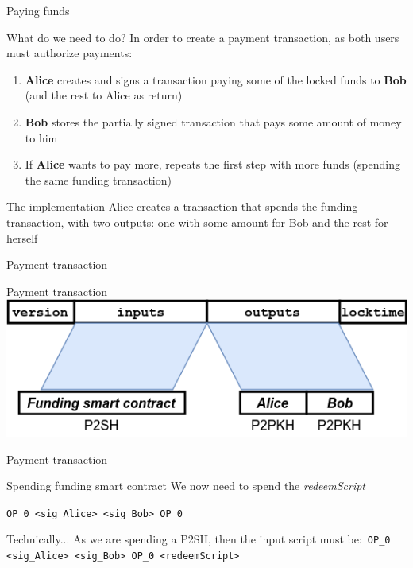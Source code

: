 \documentclass{beamer}
\begin{document}
\begin{frame}{Paying funds}
 \begin{block}{What do we need to do?}
  In order to create a payment transaction, as both users must authorize payments:
  \begin{enumerate}
   \item \textbf{Alice} creates and signs a transaction paying some of the locked funds to \textbf{Bob} (and the rest to Alice as return)
   \item \textbf{Bob} stores the partially signed transaction that pays some amount of money to him
   \item If \textbf{Alice} wants to pay more, repeats the first step with more funds (spending the same funding transaction)
  \end{enumerate}
 \end{block}
 \pause
 \begin{block}{The implementation}
  Alice creates a transaction that spends the funding transaction, with two outputs: one with some amount for Bob and the rest for herself
 \end{block}
\end{frame}
\begin{frame}{Payment transaction}
 \begin{exampleblock}{Payment transaction}
  \includegraphics[width=\textwidth, height=0.8\textheight, keepaspectratio]{img/unidir_tx_payment.png}
 \end{exampleblock}
\end{frame}
\begin{frame}{Payment transaction}
 \begin{exampleblock}{Spending funding smart contract}
  We now need to spend the \textit{redeemScript}
  \pause
  \begin{center}
   \texttt{OP\_0 <sig\_Alice> <sig\_Bob> OP\_0}
  \end{center}
 \end{exampleblock}
 \begin{exampleblock}{Technically...}
  As we are spending a P2SH, then the input script must be:\
  \texttt{OP\_0 <sig\_Alice> <sig\_Bob> OP\_0 <redeemScript>}
 \end{exampleblock}
\end{frame}
\end{document}
